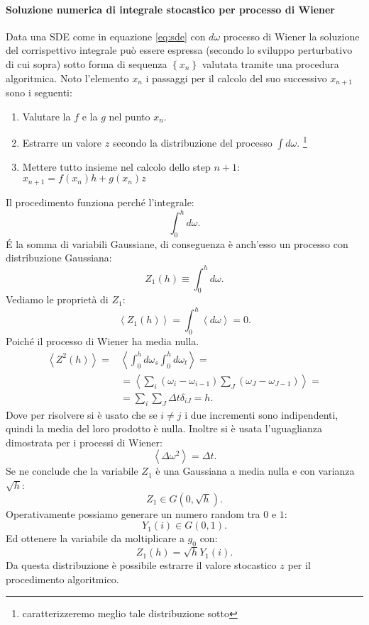 \paragraph{Soluzione numerica di integrale stocastico per processo di Wiener}
Data una SDE come in equazione \ref{eq:sde} con $d\omega$ processo di Wiener la soluzione del corrispettivo integrale può essere espressa (secondo lo sviluppo perturbativo di cui sopra) sotto forma di sequenza $\left\{x_n\right\}$ valutata tramite una procedura algoritmica. Noto l'elemento $x_n$ i passaggi per il calcolo del suo successivo $x_{n+1}$ sono i seguenti:
\begin{enumerate}
    \item Valutare la $f$ e la $g$ nel punto $x_n$.
    \item Estrarre un valore $z$ secondo la distribuzione del processo $\int d\omega$.
    \footnote{caratterizzeremo meglio tale distribuzione sotto}
    \item Mettere tutto insieme nel calcolo dello step $n+1$: $x_{n+1} = f(x_n)h + g(x_n) z$ 
\end{enumerate}
Il procedimento funziona perché l'integrale:
\[
    \int_{0}^{h} d\omega 
.\] 
\'E la somma di variabili Gaussiane, di conseguenza è anch'esso un processo con distribuzione Gaussiana:
\[
    Z_1(h) \equiv \int_{0}^{h} d\omega 
.\]
Vediamo le proprietà di $Z_1$:
\[
    \left<Z_1(h)\right> = \int_{0}^{h} \left<d\omega\right> = 0
.\] 
Poiché il processo di Wiener ha media nulla.
\[\begin{aligned}
    \left<Z^2(h) \right> = &\left<\int_{0}^{h} d\omega_s \int_{0}^{h} d\omega_t \right> = \\
			   &=\left<\sum_{i}^{} \left(\omega_i-\omega_{i-1}\right) \sum_{J}^{} \left(\omega_J-\omega_{J-1}\right)\right> = \\
			   &= \sum_{i}^{} \sum_{J}^{} \Delta t\delta_{iJ} = h
.\end{aligned}\]
Dove per risolvere si è usato che se $i \neq j$ i due incrementi sono indipendenti, quindi la media del loro prodotto è nulla. Inoltre si è usata l'uguaglianza dimostrata per i processi di Wiener:
\[
    \left<\Delta\omega^2\right> = \Delta t
.\] 
Se ne conclude che la variabile $Z_1$ è una Gaussiana a media nulla e con varianza $\sqrt{h}$:
\[
    Z_1 \in G(0,\sqrt{h}) 
.\] 
Operativamente possiamo generare un numero random tra $0$ e $1$:
\[
    Y_1(i) \in G(0,1) 
.\] 
Ed ottenere la variabile da moltiplicare a $g_0$ con:
\[
    Z_1(h) = \sqrt{h} Y_1(i) 
.\] 
Da questa distribuzione è possibile estrarre il valore stocastico $z$ per il procedimento algoritmico.
